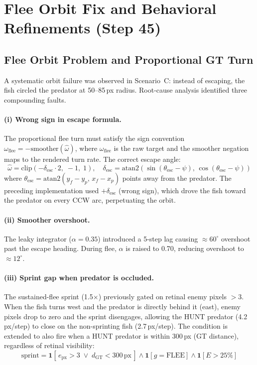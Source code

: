 \documentclass[11pt,a4paper]{article}
\begin{document}
\section{Flee Orbit Fix and Behavioral Refinements (Step 45)}\label{sec:refinements2}

\subsection{Flee Orbit Problem and Proportional GT Turn}

A systematic orbit failure was observed in Scenario~C: instead of escaping,
the fish circled the predator at 50--85\,px radius.  Root-cause analysis
identified three compounding faults.

\paragraph{(i) Wrong sign in escape formula.}
The proportional flee turn must satisfy the sign convention
$\omega_\text{flee} = -\text{smoother}(\hat\omega)$, where
$\omega_\text{flee}$ is the raw target and the smoother negation
maps to the rendered turn rate.  The correct escape angle:
\begin{equation}
  \hat\omega = \mathrm{clip}(-\delta_\text{esc} \cdot 2,\;-1,\;1),
  \quad
  \delta_\text{esc} = \mathrm{atan2}(\sin(\theta_\text{esc}-\psi),\,
                                     \cos(\theta_\text{esc}-\psi))
\end{equation}
where $\theta_\text{esc} = \mathrm{atan2}(y_f - y_p,\, x_f - x_p)$
points away from the predator.  The preceding implementation used
$+\delta_\text{esc}$ (wrong sign), which drove the fish toward the
predator on every CCW arc, perpetuating the orbit.

\paragraph{(ii) Smoother overshoot.}
The leaky integrator ($\alpha=0.35$) introduced a 5-step lag causing
${\approx}60^\circ$ overshoot past the escape heading.  During flee,
$\alpha$ is raised to 0.70, reducing overshoot to ${\approx}12^\circ$.

\paragraph{(iii) Sprint gap when predator is occluded.}
The sustained-flee sprint (1.5$\times$) previously gated on retinal
enemy pixels $> 3$.  When the fish turns west and the predator is
directly behind it (east), enemy pixels drop to zero and the sprint
disengages, allowing the HUNT predator (4.2\,px/step) to close on the
non-sprinting fish (2.7\,px/step).  The condition is extended to also
fire when a HUNT predator is within 300\,px (GT distance), regardless
of retinal visibility:
\begin{equation}
  \text{sprint} = \mathbf{1}[\,e_\text{px} > 3
    \;\vee\; d_\text{GT} < 300\,\text{px}\,]
  \wedge \mathbf{1}[g = \text{FLEE}]
  \wedge \mathbf{1}[E > 25\%]
\end{equation}
\end{document}
